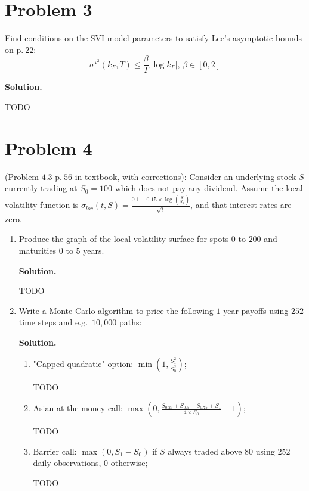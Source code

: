 \documentclass[12pt]{article}
\newenvironment{solution}{\vspace{0.2cm} \textbf{Solution.}}{}
\begin{document}
\section*{Problem 3}
Find conditions on the SVI model parameters to satisfy Lee’s asymptotic bounds on p$.\ 22$: 
$$\sigma^{\star^2} (k_F,T) \leq \frac{\beta}{T} |\log{k_F}|,\, \beta \in [0,2]$$

	\begin{solution}

	TODO

	\end{solution}

\newpage

\section*{Problem 4}
(Problem $4.3$ p$.\ 56$ in textbook, with corrections): Consider an underlying stock $S$ currently trading at $S_0 = 100$ which does not pay any dividend. Assume the local volatility function is $\sigma_{loc} (t, S) = \frac{0.1 - 0.15 \times \log\left(\frac{S}{S_0}\right)}{\sqrt{t}}$, and that interest rates are zero.

	\begin{enumerate}[label=(\alph*)]
		
		\item Produce the graph of the local volatility surface for spots $0$ to $200$ and maturities $0$ to $5$ years.
		
		\begin{solution}
			
			TODO
			
		\end{solution}
		
		\item Write a Monte-Carlo algorithm to price the following $1$-year payoffs using $252$ time steps and e.g.\ $10,000$ paths:
		
		\begin{solution}
			
			\begin{enumerate}[label=(\roman*)]
	
				\item "Capped quadratic" option: $\min\left(1,\frac{S_1^2}{S_0^2}\right)$;
								
				TODO
				
				\item Asian at-the-money-call: $\max\left(0, \frac{S_{0.25} + S_{0.5} + S_{0.75} + S_1}{4 \times S_0} - 1\right)$;
				
				TODO
				
				\item Barrier call: $\max(0, S_1 - S_0)$ if $S$ always traded above $80$ using $252$ daily observations, 0 otherwise;
				
				TODO
				
			\end{enumerate}
			
		\end{solution}
		
	\end{enumerate}
\end{document}
